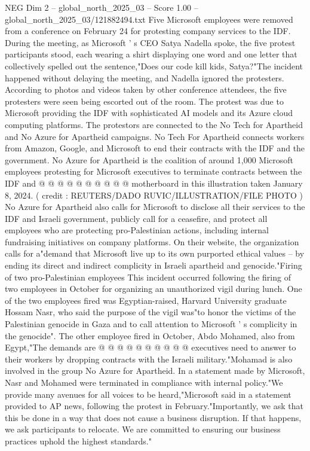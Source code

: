 \begin{textsample}{NEG Dim 2 – global\_north\_2025\_03 – Score 1.00 – global\_north\_2025\_03/121882494.txt}  \label{ex:f2_neg_044}
Five Microsoft employees were removed from a conference on February 24 for protesting company services to the IDF.
During the meeting, as Microsoft ' s CEO Satya Nadella spoke, the five protest participants stood, each wearing a shirt displaying one word and one letter that collectively spelled out the sentence,"Does our code kill kids, Satya?"The incident happened without delaying the meeting, and Nadella ignored the protesters.
According to photos and videos taken by other conference attendees, the five protesters were seen being escorted out of the room.
The protest was due to Microsoft providing the IDF with sophisticated AI models and its Azure cloud computing platforms.
The protestors are connected to the No Tech for Apartheid and No Azure for Apartheid campaigns.
No Tech For Apartheid connects workers from Amazon, Google, and Microsoft to end their contracts with the IDF and the government.
No Azure for Apartheid is the coalition of around 1,000 Microsoft employees protesting for Microsoft executives to terminate contracts between the IDF and @ @ @ @ @ @ @ @ @ @ motherboard in this illustration taken January 8, 2024. ( credit : REUTERS/DADO RUVIC/ILLUSTRATION/FILE PHOTO ) No Azure for Apartheid also calls for Microsoft to disclose all their services to the IDF and Israeli government, publicly call for a ceasefire, and protect all employees who are protecting pro-Palestinian actions, including internal fundraising initiatives on company platforms.
On their website, the organization calls for a"demand that Microsoft live up to its own purported ethical values -- by ending its direct and indirect complicity in Israeli apartheid and genocide."Firing of two pro-Palestinian employees This incident occurred following the firing of two employees in October for organizing an unauthorized vigil during lunch.
One of the two employees fired was Egyptian-raised, Harvard University graduate Hossam Nasr, who said the purpose of the vigil was"to honor the victims of the Palestinian genocide in Gaza and to call attention to Microsoft ' s complicity in the genocide".
The other employee fired in October, Abdo Mohamed, also from Egypt,"The demands are @ @ @ @ @ @ @ @ @ @ executives need to answer to their workers by dropping contracts with the Israeli military."Mohamad is also involved in the group No Azure for Apartheid.
In a statement made by Microsoft, Nasr and Mohamed were terminated in compliance with internal policy."We provide many avenues for all voices to be heard,"Microsoft said in a statement provided to AP news, following the protest in February."Importantly, we ask that this be done in a way that does not cause a business disruption.
If that happens, we ask participants to relocate.
We are committed to ensuring our business practices uphold the highest standards."

\end{textsample}
